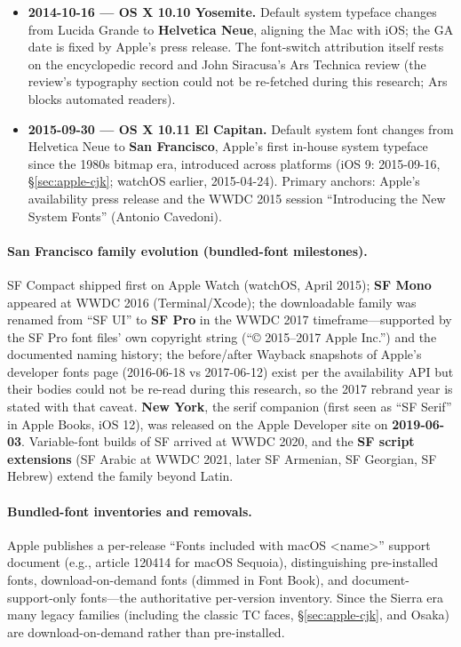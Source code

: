 \documentclass[10pt,a4paper]{article}
\begin{document}
\begin{itemize}[leftmargin=1.2em,itemsep=2pt]
Japanese fonts'' (\S\ref{sec:apple-cjk}).\cite{m-lucida,m-pubbeta,m-osxpr}
\item \textbf{2014-10-16 --- OS X 10.10 Yosemite.} Default system typeface changes from
Lucida Grande to \textbf{Helvetica Neue}, aligning the Mac with iOS; the GA date is
fixed by Apple's press release. The font-switch attribution itself rests on the
encyclopedic record and John Siracusa's Ars Technica review (the review's typography
section could not be re-fetched during this research; Ars blocks automated
readers).\cite{m-yosemite-pr,m-yosemite-font,m-yosemite-font-2}
\item \textbf{2015-09-30 --- OS X 10.11 El Capitan.} Default system font changes from
Helvetica Neue to \textbf{San Francisco}, Apple's first in-house system typeface since
the 1980s bitmap era, introduced across platforms (iOS 9: 2015-09-16,
\S\ref{sec:apple-cjk}; watchOS earlier, 2015-04-24). Primary anchors: Apple's
availability press release and the WWDC 2015 session ``Introducing the New System
Fonts'' (Antonio Cavedoni).\cite{m-elcap-pr,m-wwdc804,m-sf}
\end{itemize}

\paragraph{San Francisco family evolution (bundled-font milestones).} SF Compact
shipped first on Apple Watch (watchOS, April 2015); \textbf{SF Mono} appeared at WWDC
2016 (Terminal/Xcode); the downloadable family was renamed from ``SF UI'' to
\textbf{SF Pro} in the WWDC 2017 timeframe---supported by the SF Pro font files' own
copyright string (``\copyright{} 2015--2017 Apple Inc.'') and the documented naming
history; the before/after Wayback snapshots of Apple's developer fonts page
(2016-06-18 vs 2017-06-12) exist per the availability API but their bodies could not
be re-read during this research, so the 2017 rebrand year is stated with that caveat.
\textbf{New York}, the serif companion (first seen as ``SF Serif'' in Apple Books, iOS
12), was released on the Apple Developer site on \textbf{2019-06-03}. Variable-font
builds of SF arrived at WWDC 2020, and the \textbf{SF script extensions} (SF Arabic at
WWDC 2021, later SF Armenian, SF Georgian, SF Hebrew) extend the family beyond
Latin.\cite{m-sf,m-sfpro,m-ny,m-devfonts}

\paragraph{Bundled-font inventories and removals.} Apple publishes a per-release
``Fonts included with macOS \textless name\textgreater'' support document (e.g.,
article 120414 for macOS Sequoia), distinguishing pre-installed fonts,
download-on-demand fonts (dimmed in Font Book), and document-support-only fonts---the
authoritative per-version inventory. Since the Sierra era many legacy families
(including the classic TC faces, \S\ref{sec:apple-cjk}, and Osaka) are
download-on-demand rather than pre-installed.\cite{m-sequoia-fonts}
\end{document}
